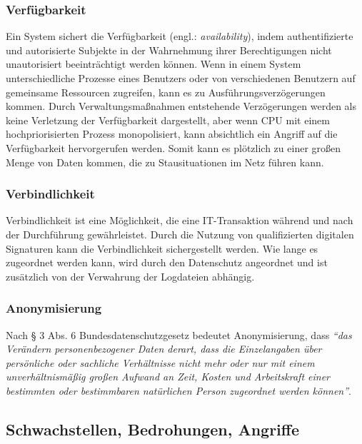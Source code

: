 \subsubsection{Verfügbarkeit}

Ein System sichert die Verfügbarkeit (engl.: \textit{availability}), indem authentifizierte und autorisierte Subjekte in der Wahrnehmung ihrer Berechtigungen nicht unautorisiert beeinträchtigt werden können. Wenn in einem System unterschiedliche Prozesse eines Benutzers oder von verschiedenen Benutzern auf gemeinsame Ressourcen zugreifen, kann es zu Ausführungsverzögerungen kommen. Durch Verwaltungsmaßnahmen entstehende Verzögerungen werden als keine Verletzung der Verfügbarkeit dargestellt, aber wenn CPU mit einem hochpriorisierten Prozess monopolisiert, kann absichtlich ein Angriff auf die Verfügbarkeit hervorgerufen werden. Somit kann es plötzlich zu einer großen Menge von Daten kommen, die zu Stausituationen im Netz führen kann\cite[33]{eckert2013sicherheit}.

\subsubsection{Verbindlichkeit}

Verbindlichkeit ist eine Möglichkeit, die eine IT-Transaktion während und nach der Durchführung gewährleistet. Durch die Nutzung von qualifizierten digitalen Signaturen kann die Verbindlichkeit sichergestellt werden. Wie lange es zugeordnet werden kann, wird durch den Datenschutz angeordnet und ist zusätzlich von der Verwahrung der Logdateien abhängig\cite{secupedia11}.

\subsubsection{Anonymisierung}

Nach § 3 Abs. 6 Bundesdatenschutzgesetz bedeutet Anonymisierung, dass \emph{"`das Verändern personenbezogener Daten derart, dass die Einzelangaben über persönliche oder sachliche Verhältnisse nicht mehr oder nur mit einem unverhältnismäßig großen Aufwand an Zeit, Kosten und Arbeitskraft einer bestimmten oder bestimmbaren natürlichen Person zugeordnet werden können"'}\cite{dsba2018}. 

\subsection{Schwachstellen, Bedrohungen, Angriffe}

